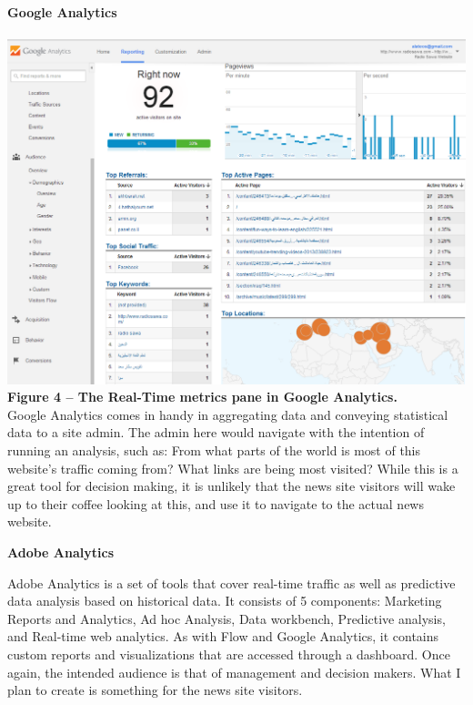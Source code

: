\documentclass[12pt]{article}
\begin{document}
\noindent\textbf{Google Analytics} \\ \\
\noindent\includegraphics[scale=0.4]{img/google_analytics} \\
\noindent\textbf{Figure 4 -- The Real-Time metrics pane in Google Analytics.} \\

Google Analytics comes in handy in aggregating data and conveying statistical data to a site admin. The admin here would navigate with the intention of running an analysis, such as: From what parts of the world is most of this website's traffic coming from? What links are being most visited?
While this is a great tool for decision making, it is unlikely that the news site visitors will wake up to their coffee looking at this, and use it to navigate to the actual news website. \\

\newpage

\noindent\textbf{Adobe Analytics}

Adobe Analytics is a set of tools that cover real-time traffic as well as predictive data analysis based on historical data. It consists of 5 components: Marketing Reports and Analytics, Ad hoc Analysis, Data workbench, Predictive analysis, and Real-time web analytics. As with Flow and Google Analytics, it contains custom reports and visualizations that are accessed through a dashboard. Once again, the intended audience is that of management and decision makers. What I plan to create is something for the news site visitors. \\
\end{document}
